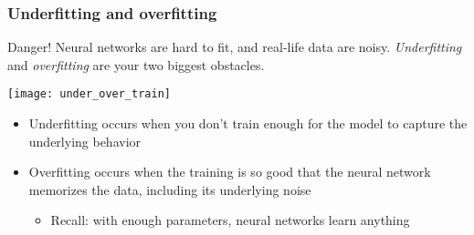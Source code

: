 \begin{frame}
    \frametitle{Underfitting and overfitting}

    \begin{alertblock}{Danger!}
        Neural networks are hard to fit, and real-life data are noisy.
        \emph{Underfitting} and \emph{overfitting} are your two biggest obstacles.
    \end{alertblock}
    \vspace{1ex}

    \texttt{[image: under\_over\_train]}
    \pause

    \begin{itemize}
        \item Underfitting occurs when you don't train enough for the model to capture the underlying behavior
        \item Overfitting occurs when the training is so good that the neural network memorizes the data, including its underlying noise
        \begin{itemize}
            \item Recall: with enough parameters, neural networks learn anything
        \end{itemize}
    \end{itemize}
\end{frame}

